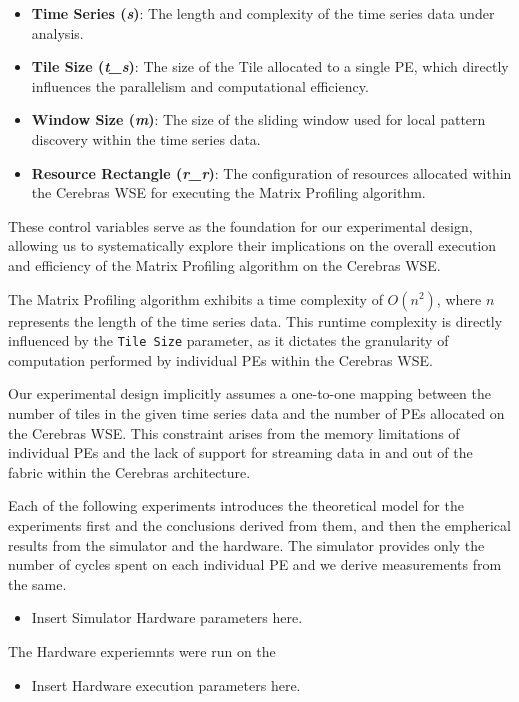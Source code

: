 \begin{itemize}
    \item \textbf{Time Series (\textit{s})}: The length and complexity of the time series data under analysis.
    \item \textbf{Tile Size (\textit{t\_s})}: The size of the Tile allocated to a single PE, which directly influences the parallelism and computational efficiency.
    \item \textbf{Window Size (\textit{m})}: The size of the sliding window used for local pattern discovery within the time series data.
    \item \textbf{Resource Rectangle (\textit{r\_r})}: The configuration of resources allocated within the Cerebras WSE for executing the Matrix Profiling algorithm.
\end{itemize}

These control variables serve as the foundation for our experimental design, allowing us to systematically explore their implications on the overall execution and efficiency of the Matrix Profiling algorithm on the Cerebras WSE.

The Matrix Profiling algorithm exhibits a time complexity of \(O(n^2)\), where \(n\) represents the length of the time series data. This runtime complexity is directly influenced by the \texttt{Tile Size} parameter, as it dictates the granularity of computation performed by individual PEs within the Cerebras WSE.

Our experimental design implicitly assumes a one-to-one mapping between the number of tiles in the given time series data and the number of PEs allocated on the Cerebras WSE. This constraint arises from the memory limitations of individual PEs and the lack of support for streaming data in and out of the fabric within the Cerebras architecture.

Each of the following experiments introduces the theoretical model for the experiments first and the conclusions derived from them, and then the empherical results from the simulator and the hardware. The simulator provides only the number of cycles spent on each individual PE and we derive measurements from the same.

\begin{itemize}
    \item Insert Simulator Hardware parameters here. 
\end{itemize}
The Hardware experiemnts were run on the 
\begin{itemize}
    \item Insert Hardware execution parameters here.
\end{itemize}

